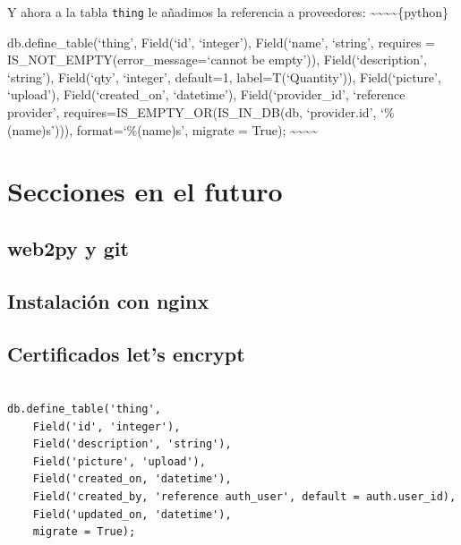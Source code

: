 \documentclass[
  12pt,
  spanish,
]{article}
\begin{document}
Y ahora a la tabla \texttt{thing} le añadimos la referencia a
proveedores:
\textasciitilde\textasciitilde\textasciitilde\textasciitilde\{python\}

db.define\_table(`thing', Field(`id', `integer'), Field(`name',
`string', requires = IS\_NOT\_EMPTY(error\_message=`cannot be empty')),
Field(`description', `string'), Field(`qty', `integer', default=1,
label=T(`Quantity')), Field(`picture', `upload'), Field(`created\_on',
`datetime'), Field(`provider\_id', `reference provider',
requires=IS\_EMPTY\_OR(IS\_IN\_DB(db, `provider.id', `\%(name)s'))),
format=`\%(name)s', migrate = True);
\textasciitilde\textasciitilde\textasciitilde\textasciitilde{}

\hypertarget{secciones-en-el-futuro}{%
\section{Secciones en el futuro}\label{secciones-en-el-futuro}}

\hypertarget{web2py-y-git}{%
\subsection{web2py y git}\label{web2py-y-git}}

\hypertarget{instalaciuxf3n-con-nginx}{%
\subsection{Instalación con nginx}\label{instalaciuxf3n-con-nginx}}

\hypertarget{certificados-lets-encrypt}{%
\subsection{Certificados let's
encrypt}\label{certificados-lets-encrypt}}

\begin{verbatim}

db.define_table('thing',
    Field('id', 'integer'),
    Field('description', 'string'),
    Field('picture', 'upload'),
    Field('created_on, 'datetime'),
    Field('created_by, 'reference auth_user', default = auth.user_id),
    Field('updated_on, 'datetime'),
    migrate = True);
\end{verbatim}
\end{document}

